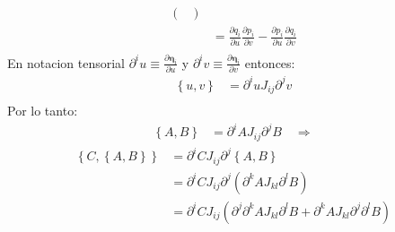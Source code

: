 \documentclass[a4paper]{article}
\begin{document}
\begin{answer}[punto 21]
\begin{align*}
\begin{pmatrix}
                 \end{pmatrix}\\
            &= \frac{\partial q_i}{\partial u} \frac{\partial p_i}{\partial v} - \frac{\partial p_i}{\partial u} \frac{\partial q_i}{\partial v}\\
        \end{align*}
        En notacion tensorial $\partial^i u \equiv \frac{\partial \pmb \eta_i }{\partial u}$ y $\partial^i v \equiv \frac{\partial \pmb \eta_i }{\partial v}$ entonces:
        \begin{align*}
            \left\{u,v\right\} &= \partial^i u J_{ij} \partial^j v\\
        \end{align*}
        Por lo tanto:
        \begin{align*}
            \left\{A,B\right\} &= \partial^i A J_{ij} \partial^j B \quad \Rightarrow 
        \end{align*} 
        \begin{align*}
            \left\{C,\left\{A,B\right\}\right\} &= \partial^i C J_{ij} \partial^j \left\{A,B\right\} \\
            &= \partial^i C J_{ij} \partial^j \left(\partial^k A J_{kl} \partial^l B\right)\\
            &= \partial^i C J_{ij}\left( \partial^j \partial^k A J_{kl} \partial^l B + \partial^k A J_{kl} \partial^j \partial^l B\right)\\
        \end{align*}



    \end{answer}
    
\end{document}
